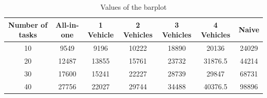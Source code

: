 \documentclass[fontsize=12pt]{scrartcl} %
\begin{document}
\begin{table}
\centering
\begin{tabular}{|c|c|c|c|c|c|c|}
\hline
Number of tasks & All-in-one & 1 Vehicle & 2 Vehicles & 3 Vehicles & 4 Vehicles & Naive\\ 
\hline
10 & 9549 & 9196 & 10222 & 18890 & 20136 & 24029\\ 
\hline
20 & 12487 & 13855 & 15761 & 23732 & 31876.5 & 44214\\ 
\hline
30 & 17600 & 15241 & 22227 & 28739 & 29847 & 68731\\ 
\hline
40 & 27756 & 22027 & 29744 & 34488 & 40376.5 & 98896\\ 
\hline
\hline\end{tabular}
\label{table:table}
\caption{\small{Values of the barplot}} 
\end{table}
\end{document}
